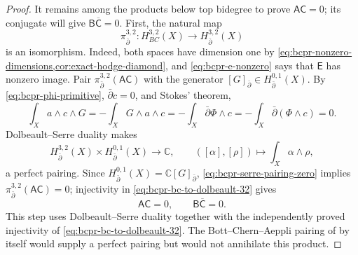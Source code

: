 \begin{proof}
It remains among the products below top bidegree to prove
$\mathsf A\mathsf C=0$; its conjugate will give
$\mathsf B\overline{\mathsf C}=0$.  First, the natural map
\begin{equation}
 \pi_{\bar\partial}^{3,2}\colon H^{3,2}_{BC}(X)
 \longrightarrow H^{3,2}_{\bar\partial}(X)
\label{eq:bcpr-bc-to-dolbeault-32}
\end{equation}
is an isomorphism.  Indeed, both spaces have dimension one by
\cref{eq:bcpr-nonzero-dimensions,cor:exact-hodge-diamond}, and
\cref{eq:bcpr-e-nonzero} says that $\mathsf E$ has nonzero image.
Pair $\pi_{\bar\partial}^{3,2}(\mathsf A\mathsf C)$ with the generator
$[G]_{\bar\partial}\in H^{0,1}_{\bar\partial}(X)$.  By
\cref{eq:bcpr-phi-primitive}, $\bar\partial c=0$, and Stokes' theorem,
\begin{equation}
 \int_Xa\wedge c\wedge G
 =-\int_XG\wedge a\wedge c
 =-\int_X\bar\partial\Phi\wedge c
 =-\int_X\bar\partial(\Phi\wedge c)=0.
\label{eq:bcpr-serre-pairing-zero}
\end{equation}
Dolbeault--Serre duality makes
\begin{equation}
 H^{3,2}_{\bar\partial}(X)\times
 H^{0,1}_{\bar\partial}(X)\longrightarrow\mathbb C,
 \qquad
 ([\alpha],[\rho])\longmapsto\int_X\alpha\wedge\rho,
\label{eq:bcpr-serre-pairing}
\end{equation}
a perfect pairing.  Since
$H^{0,1}_{\bar\partial}(X)=\mathbb C[G]_{\bar\partial}$,
\cref{eq:bcpr-serre-pairing-zero} implies
$\pi_{\bar\partial}^{3,2}(\mathsf A\mathsf C)=0$; injectivity in
\cref{eq:bcpr-bc-to-dolbeault-32} gives
\begin{equation}
 \mathsf A\mathsf C=0,
 \qquad
 \mathsf B\overline{\mathsf C}=0.
\label{eq:bcpr-second-zero-products}
\end{equation}
This step uses Dolbeault--Serre duality together with the independently
proved injectivity of \cref{eq:bcpr-bc-to-dolbeault-32}.  The
Bott--Chern--Aeppli pairing of
\cite[\S2.c]{Schweitzer2007} by itself would supply a perfect pairing but
would not annihilate this product.


\end{proof}

